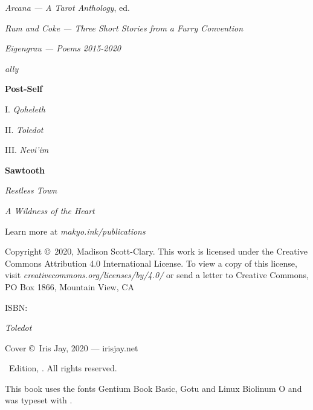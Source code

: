 \singlespacing
\thispagestyle{empty}
\begin{center}
    \TitleFamily

    \vspace{2ex}

    \emph{Arcana — A Tarot Anthology}, ed.

    \vspace{1ex}

    \emph{Rum and Coke — Three Short Stories from a Furry Convention}

    \vspace{1ex}

    \emph{Eigengrau — Poems 2015-2020}

    \vspace{1ex}

    \emph{ally}

    \vspace{2ex}
    
    \textbf{Post-Self}

    I. \emph{Qoheleth}

    II. \emph{Toledot}

    III. \emph{Nevi'im}

    \vspace{2ex}

    \textbf{Sawtooth}

    \emph{Restless Town}

    \emph{A Wildness of the Heart}

    \vspace{2em}

    Learn more at \emph{makyo.ink/publications}
\end{center}
\vfill
\singlespacing
{\small\parindent0pt\parskip5pt
\noindent Copyright \copyright\ 2020, Madison Scott-Clary. This work is licensed under the Creative Commons Attribution 4.0 International License. To view a copy of this license, visit \mbox{\emph{creativecommons.org/licenses/by/4.0/}} or send a letter to Creative Commons, PO Box 1866, Mountain View, CA

\vspace{1ex}

ISBN: \ISBN

\vspace{1ex}

\textit{Toledot}

\vspace{1ex}

Cover \copyright\ Iris Jay, 2020 --- irisjay.net

\vspace{1ex}


\Edition\ Edition, \Year. All rights reserved.

\vspace{1ex}

This book uses the fonts Gentium Book Basic, {\DisplayFont Gotu} and {\TitleFont Linux Biolinum O} and was typeset with {\XeLaTeX}.
}%

\clearpage
